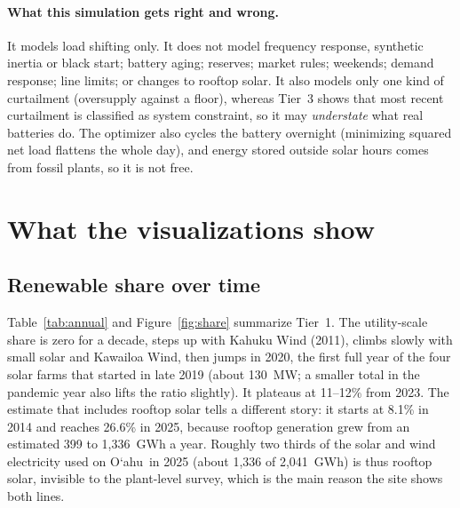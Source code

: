 \documentclass[11pt,a4paper]{article}
\newcommand{\okina}{\textquoteleft}
\newcommand{\Oahu}{\texorpdfstring{O\okina ahu}{Oahu}}
\begin{document}
\paragraph{What this simulation gets right and wrong.} It models load shifting only. It does not model frequency
response, synthetic inertia or black start; battery aging; reserves; market rules; weekends; demand response; line
limits; or changes to rooftop solar. It also models only one kind of curtailment (oversupply against a floor),
whereas Tier~3 shows that most recent curtailment is classified as system constraint, so it may
\emph{understate} what real batteries do. The optimizer also cycles the battery overnight (minimizing squared
net load flattens the whole day), and energy stored outside solar hours comes from fossil plants, so it is not free.

\section{What the visualizations show}
\label{sec:results}

\subsection{Renewable share over time}
Table~\ref{tab:annual} and Figure~\ref{fig:share} summarize Tier~1. The utility-scale share is zero for a
decade, steps up with Kahuku Wind (2011), climbs slowly with small solar and Kawailoa Wind, then jumps in
2020, the first full year of the four solar farms that started in late 2019 (about 130~MW; a smaller total in the
pandemic year also lifts the ratio slightly). It plateaus at 11--12\% from 2023. The estimate that includes rooftop solar tells a different story: it starts
at 8.1\% in 2014 and reaches 26.6\% in 2025, because rooftop generation grew from an estimated 399 to
1,336~GWh a year. Roughly two thirds of the solar and wind electricity used on \Oahu\ in 2025 (about 1,336 of 2,041~GWh) is thus rooftop
solar, invisible to the plant-level survey, which is the main reason the site shows both lines.
\end{document}
